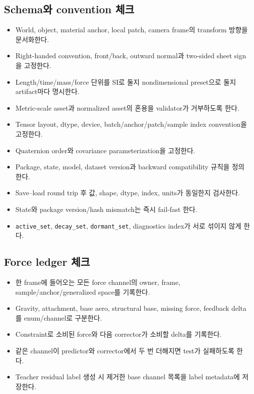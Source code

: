 \documentclass[10pt,a4paper]{article}
\newcommand{\todo}{\textcolor{TodoGray}{\(\square\)}}
\newcommand{\code}[1]{\texttt{#1}}
\begin{document}
\subsection*{Schema와 convention 체크}

\begin{itemize}
  \item[\todo] World, object, material anchor, local patch, camera frame의 transform 방향을 문서화한다.
  \item[\todo] Right-handed convention, front/back, outward normal과 two-sided sheet sign을 고정한다.
  \item[\todo] Length/time/mass/force 단위를 SI로 둘지 nondimensional preset으로 둘지 artifact마다 명시한다.
  \item[\todo] Metric-scale asset과 normalized asset의 혼용을 validator가 거부하도록 한다.
  \item[\todo] Tensor layout, dtype, device, batch/anchor/patch/sample index convention을 고정한다.
  \item[\todo] Quaternion order와 covariance parameterization을 고정한다.
  \item[\todo] Package, state, model, dataset version과 backward compatibility 규칙을 정의한다.
  \item[\todo] Save--load round trip 후 값, shape, dtype, index, units가 동일한지 검사한다.
  \item[\todo] State와 package version/hash mismatch는 즉시 fail-fast 한다.
  \item[\todo] \code{active\_set}, \code{decay\_set}, \code{dormant\_set}, diagnostics index가 서로 섞이지 않게 한다.
\end{itemize}

\subsection*{Force ledger 체크}

\begin{itemize}
  \item[\todo] 한 frame에 들어오는 모든 force channel의 owner, frame, sample/anchor/generalized space를 기록한다.
  \item[\todo] Gravity, attachment, base aero, structural base, missing force, feedback delta를 enum/channel로 구분한다.
  \item[\todo] Constraint로 소비된 force와 다음 corrector가 소비할 delta를 기록한다.
  \item[\todo] 같은 channel이 predictor와 corrector에서 두 번 더해지면 test가 실패하도록 한다.
  \item[\todo] Teacher residual label 생성 시 제거한 base channel 목록을 label metadata에 저장한다.
\end{itemize}
\end{document}
